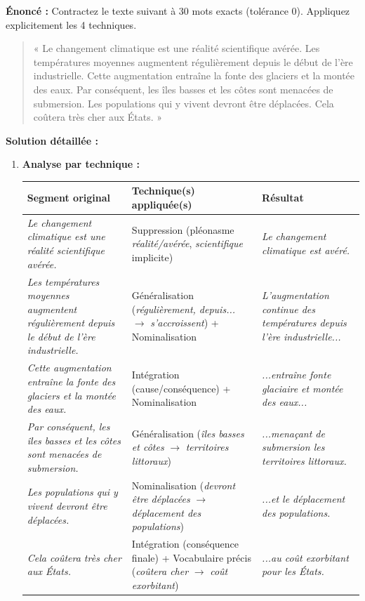 \documentclass[11pt]{article}
\begin{document}
\begin{exoresolu}
\textbf{Énoncé :} Contractez le texte suivant à 30 mots exacts (tolérance 0). Appliquez explicitement les 4 techniques.
\begin{quote}
« Le changement climatique est une réalité scientifique avérée. Les températures moyennes augmentent régulièrement depuis le début de l'ère industrielle. Cette augmentation entraîne la fonte des glaciers et la montée des eaux. Par conséquent, les îles basses et les côtes sont menacées de submersion. Les populations qui y vivent devront être déplacées. Cela coûtera très cher aux États. »
\end{quote}
\tcblower
\textbf{Solution détaillée :}
\begin{enumerate}
    \item \textbf{Analyse par technique :}
    \begin{center}
    \begin{tabularx}{\linewidth}{|l|X|l|}\hline
    \textbf{Segment original} & \textbf{Technique(s) appliquée(s)} & \textbf{Résultat} \\ \hline
    \emph{Le changement climatique est une réalité scientifique avérée.} & Suppression (pléonasme \emph{réalité/avérée}, \emph{scientifique} implicite) & \emph{Le changement climatique est avéré.} \\ \hline
    \emph{Les températures moyennes augmentent régulièrement depuis le début de l'ère industrielle.} & Généralisation (\emph{régulièrement, depuis...} $\rightarrow$ \emph{s'accroissent}) + Nominalisation & \emph{L'augmentation continue des températures depuis l'ère industrielle...} \\ \hline
    \emph{Cette augmentation entraîne la fonte des glaciers et la montée des eaux.} & Intégration (cause/conséquence) + Nominalisation & \emph{...entraîne fonte glaciaire et montée des eaux...} \\ \hline
    \emph{Par conséquent, les îles basses et les côtes sont menacées de submersion.} & Généralisation (\emph{îles basses et côtes} $\rightarrow$ \emph{territoires littoraux}) & \emph{...menaçant de submersion les territoires littoraux.} \\ \hline
    \emph{Les populations qui y vivent devront être déplacées.} & Nominalisation (\emph{devront être déplacées} $\rightarrow$ \emph{déplacement des populations}) & \emph{...et le déplacement des populations.} \\ \hline
    \emph{Cela coûtera très cher aux États.} & Intégration (conséquence finale) + Vocabulaire précis (\emph{coûtera cher} $\rightarrow$ \emph{coût exorbitant}) & \emph{...au coût exorbitant pour les États.} \\ \hline

\end{tabularx}
\end{center}
\end{enumerate}
\end{exoresolu}
\end{document}
